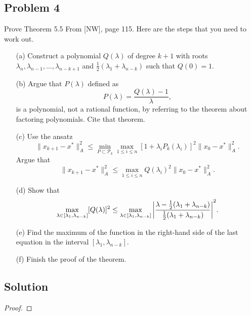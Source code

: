 \documentclass[12pt]{report}
\begin{document}


\begin{problem}%
\subsection*{Problem 4}

Prove Theorem 5.5 From [NW], page 115. Here are the steps that you need to work out.
\begin{enumerate}
    \item [(a)] Construct a polynomial $Q(\lambda)$ of degree $k+1$ with roots $\lambda_n,\lambda_{n-1},\dots,\lambda_{n-k+1}$ and $\frac{1}{2}(\lambda_1 + \lambda_{n-k})$ such that $Q(0) = 1$.
    
    \item [(b)] Argue that $P(\lambda)$ defined as
    \[
         P(\lambda) = \frac{Q(\lambda)-1}{\lambda},
    \]
    is a polynomial, not a rational function, by referring to the theorem about factoring polynomials. Cite that theorem.
    \item[(c)] Use the ansatz
    \[
         \|x_{k+1} - x^*\|_A^2 \leq \min_{P \subset \mathcal{P}_k}\max_{1\leq i \leq n}[1 + \lambda_i P_k(\lambda_i)]^2\|x_0 - x^*\|_A^2.   
    \]
    Argue that 
    \[
        \|x_{k+1} - x^*\|_A^2 \leq \max_{1\leq i \leq n}Q(\lambda_i)^2\|x_0 - x^* \|_A^2.
    \]
    \item[(d)] Show that
    \[
         \max_{\lambda \in [\lambda_1,\lambda_{n-k}]}[Q(\lambda)]^2 \leq \max_{\lambda \in [\lambda_1,\lambda_{n-k}]} {\left|\frac{\lambda - \frac{1}{2}(\lambda_1 + \lambda_{n-k})}{\frac{1}{2}(\lambda_1 + \lambda_{n-k})}\right|}^2.
    \]
    \item[(e)] Find the maximum of the function in the right-hand side of the last equation in the interval $[\lambda_1,\lambda_{n-k}]$.
    \item[(f)] Finish the proof of the theorem.
\end{enumerate}

\subsection*{Solution}
\begin{proof}


\end{proof}
\end{problem}
\end{document}
